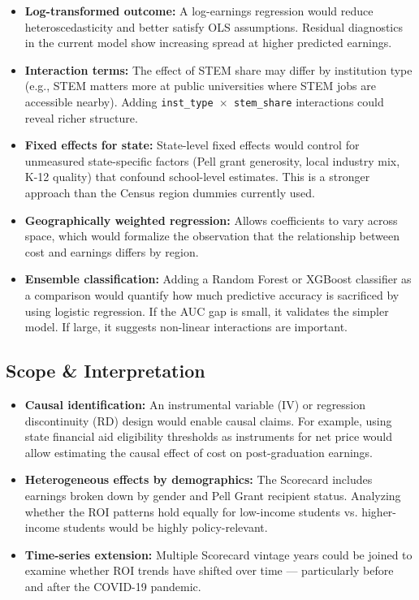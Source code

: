 \documentclass[12pt, letterpaper]{article}
\begin{document}
\begin{itemize}
  \item \textbf{Log-transformed outcome:} A log-earnings regression would reduce heteroscedasticity and better satisfy OLS assumptions. Residual diagnostics in the current model show increasing spread at higher predicted earnings.

  \item \textbf{Interaction terms:} The effect of STEM share may differ by institution type (e.g., STEM matters more at public universities where STEM jobs are accessible nearby). Adding \texttt{inst\_type $\times$ stem\_share} interactions could reveal richer structure.

  \item \textbf{Fixed effects for state:} State-level fixed effects would control for unmeasured state-specific factors (Pell grant generosity, local industry mix, K-12 quality) that confound school-level estimates. This is a stronger approach than the Census region dummies currently used.

  \item \textbf{Geographically weighted regression:} Allows coefficients to vary across space, which would formalize the observation that the relationship between cost and earnings differs by region.

  \item \textbf{Ensemble classification:} Adding a Random Forest or XGBoost classifier as a comparison would quantify how much predictive accuracy is sacrificed by using logistic regression. If the AUC gap is small, it validates the simpler model. If large, it suggests non-linear interactions are important.
\end{itemize}

\subsection{Scope \& Interpretation}

\begin{itemize}
  \item \textbf{Causal identification:} An instrumental variable (IV) or regression discontinuity (RD) design would enable causal claims. For example, using state financial aid eligibility thresholds as instruments for net price would allow estimating the causal effect of cost on post-graduation earnings.

  \item \textbf{Heterogeneous effects by demographics:} The Scorecard includes earnings broken down by gender and Pell Grant recipient status. Analyzing whether the ROI patterns hold equally for low-income students vs. higher-income students would be highly policy-relevant.

  \item \textbf{Time-series extension:} Multiple Scorecard vintage years could be joined to examine whether ROI trends have shifted over time — particularly before and after the COVID-19 pandemic.
\end{itemize}
\end{document}
